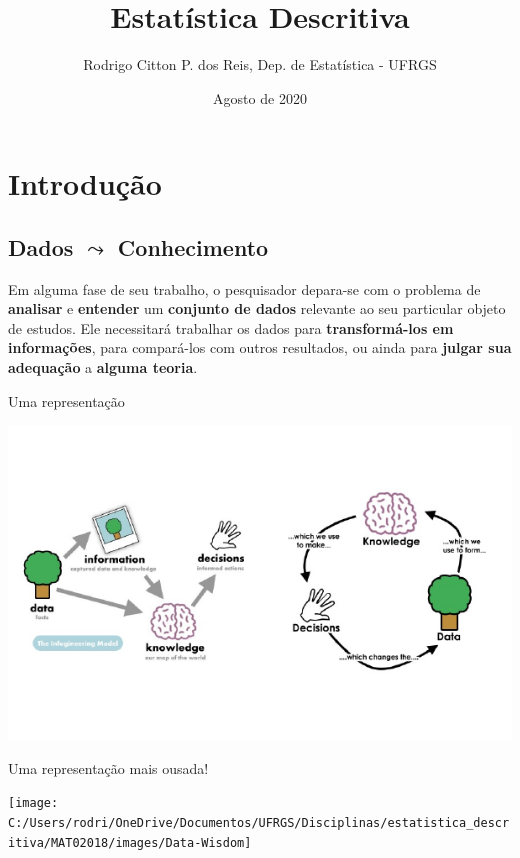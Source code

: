 \documentclass[]{tufte-book}
\title{Estatística Descritiva}
\author{Rodrigo Citton P. dos Reis, Dep. de Estatística - UFRGS}
\date{Agosto de 2020}
\begin{document}
\maketitle




\hypertarget{introduuxe7uxe3o}{%
\chapter{Introdução}\label{introduuxe7uxe3o}}

\hypertarget{dados-leadsto-conhecimento}{%
\section{\texorpdfstring{Dados \(\leadsto\)
Conhecimento}{Dados \textbackslash leadsto Conhecimento}}\label{dados-leadsto-conhecimento}}

Em alguma fase de seu trabalho, o pesquisador depara-se com o problema
de \textbf{analisar} e \textbf{entender} um \textbf{conjunto de dados}
relevante ao seu particular objeto de estudos. Ele necessitará trabalhar
os dados para \textbf{transformá-los em informações}, para compará-los
com outros resultados, ou ainda para \textbf{julgar sua adequação} a
\textbf{alguma teoria}.

Uma representação

\begin{center}\includegraphics[width=1\linewidth,height=0.8\textheight]{conceitos_basicos_files/figure-latex/unnamed-chunk-1-1} \end{center}

Uma representação mais ousada!

\begin{center}\texttt{[image: C:/Users/rodri/OneDrive/Documentos/UFRGS/Disciplinas/estatistica\_descritiva/MAT02018/images/Data-Wisdom]} \end{center}
\end{document}
